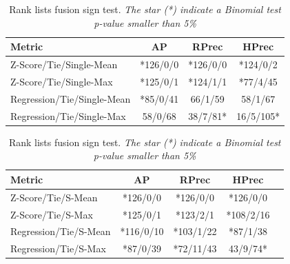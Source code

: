 \begin{table}
  \vspace{0.5cm}

\end{table}

\begin{table}
  \centering
  \caption{Rank lists fusion sign test. \textit{The star (*) indicate a Binomial test p-value smaller than 5\%}}
  \label{tab:fusion_sign_test}

  \label{tab:fusion_A}
  \begin{tabular}{l c c c}
    \toprule
    Metric
    & AP
    & RPrec
    & HPrec \\
    \midrule
    Z-Score/Tie/Single-Mean    & *126/0/0 & *126/0/0 & *124/0/2 \\
    Z-Score/Tie/Single-Max     & *125/0/1 & *124/1/1 & *77/4/45 \\
    Regression/Tie/Single-Mean & *85/0/41 & 66/1/59  & 58/1/67  \\
    Regression/Tie/Single-Max  & 58/0/68  & 38/7/81* & 16/5/105* \\
    \bottomrule
  \end{tabular}

  \vspace{0.5cm}

  \label{tab:fusion_B}
  \begin{tabular}{l c c c c}
    \toprule
    Metric
    & AP
    & RPrec
    & HPrec \\
    \midrule
    Z-Score/Tie/S-Mean    & *126/0/0  & *126/0/0  & *126/0/0 \\
    Z-Score/Tie/S-Max     & *125/0/1  & *123/2/1  & *108/2/16\\
    Regression/Tie/S-Mean & *116/0/10 & *103/1/22 & *87/1/38 \\
    Regression/Tie/S-Max  & *87/0/39  & *72/11/43 & 43/9/74* \\
    \bottomrule
  \end{tabular}

\end{table}

